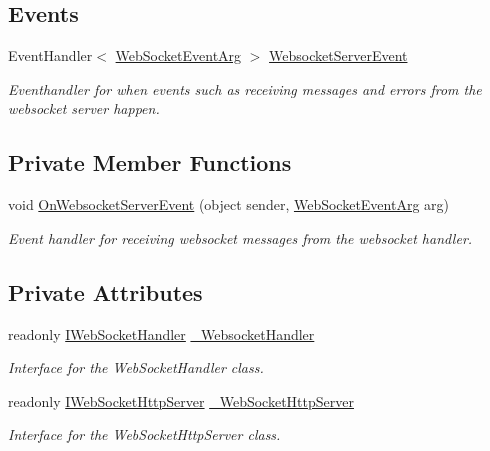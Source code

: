 \subsection*{Events}
\begin{DoxyCompactItemize}
\item 
Event\+Handler$<$ \mbox{\hyperlink{class_simple_web_socket_server_library_1_1_web_socket_event_arg}{Web\+Socket\+Event\+Arg}} $>$ \mbox{\hyperlink{class_simple_web_socket_server_library_1_1_simple_web_socket_server_adfd5705f4c6ccf291409035cd1d1e34b}{Websocket\+Server\+Event}}
\begin{DoxyCompactList}\small\item\em Eventhandler for when events such as receiving messages and errors from the websocket server happen. \end{DoxyCompactList}\end{DoxyCompactItemize}
\subsection*{Private Member Functions}
\begin{DoxyCompactItemize}
\item 
void \mbox{\hyperlink{class_simple_web_socket_server_library_1_1_simple_web_socket_server_acc5670ca5bb72d689d08682f5328477e}{On\+Websocket\+Server\+Event}} (object sender, \mbox{\hyperlink{class_simple_web_socket_server_library_1_1_web_socket_event_arg}{Web\+Socket\+Event\+Arg}} arg)
\begin{DoxyCompactList}\small\item\em Event handler for receiving websocket messages from the websocket handler. \end{DoxyCompactList}\end{DoxyCompactItemize}
\subsection*{Private Attributes}
\begin{DoxyCompactItemize}
\item 
readonly \mbox{\hyperlink{interface_simple_web_socket_server_library_1_1_simple_web_socket_handler_1_1_i_web_socket_handler}{I\+Web\+Socket\+Handler}} \mbox{\hyperlink{class_simple_web_socket_server_library_1_1_simple_web_socket_server_a4bfb888a3f666e48f561a55373eb4bd3}{\+\_\+\+Websocket\+Handler}}
\begin{DoxyCompactList}\small\item\em Interface for the Web\+Socket\+Handler class. \end{DoxyCompactList}\item 
readonly \mbox{\hyperlink{interface_simple_web_socket_server_library_1_1_simple_web_socket_http_server_1_1_i_web_socket_http_server}{I\+Web\+Socket\+Http\+Server}} \mbox{\hyperlink{class_simple_web_socket_server_library_1_1_simple_web_socket_server_af16d2b86849d66572a4bbf06ddc5e94e}{\+\_\+\+Web\+Socket\+Http\+Server}}
\begin{DoxyCompactList}\small\item\em Interface for the Web\+Socket\+Http\+Server class. \end{DoxyCompactList}\end{DoxyCompactItemize}


